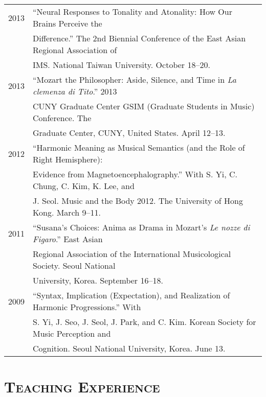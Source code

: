 \documentclass[a4paper,11pt]{article}
\begin{document}
\begin{tabular}{p{2.5cm} p{12.5cm}}
  2013 & “Neural Responses to Tonality and Atonality: How Our Brains Perceive the\\
  & Difference.” The 2nd Biennial Conference of the East Asian Regional Association of\\
  & IMS. National Taiwan University. October 18–20.\\[2mm]
  
  2013 & “Mozart the Philosopher: Aside, Silence, and Time in \textit{La clemenza di Tito}.” 2013\\
  & CUNY Graduate Center GSIM (Graduate Students in Music) Conference. The\\
  & Graduate Center, CUNY, United States. April 12–13.\\[2mm]

  2012 & “Harmonic Meaning as Musical Semantics (and the Role of Right Hemisphere):\\
  & Evidence from Magnetoencephalography.” With S. Yi, C. Chung, C. Kim, K. Lee, and\\
  & J. Seol. Music and the Body 2012. The University of Hong Kong. March 9–11.\\[2mm]

  2011 & “Susana’s Choices: Anima as Drama in Mozart’s \textit{Le nozze di Figaro}.” East Asian\\
  & Regional Association of the International Musicological Society. Seoul National\\
  & University, Korea. September 16–18.\\[2mm]

  2009 & “Syntax, Implication (Expectation), and Realization of Harmonic Progressions.” With\\
  & S. Yi, J. Seo, J. Seol, J. Park, and C. Kim. Korean Society for Music Perception and\\
  & Cognition. Seoul National University, Korea. June 13.
  \end{tabular}
  
  \vspace{5.0mm}
  
  \section*{\textsc{Teaching Experience}}
  
\end{document}
